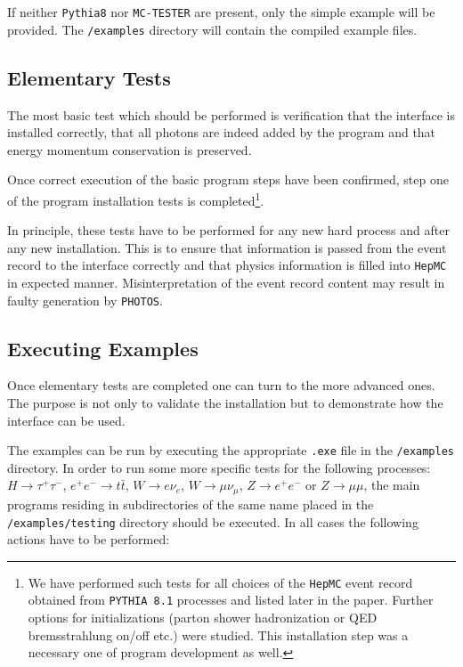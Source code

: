 \documentclass[]{Photos_interface_design}
\begin{document}
If neither {\tt Pythia8} nor {\tt MC-TESTER} are present, only the simple example will be provided. The {\tt /examples} directory will contain the compiled example files.

\subsection{Elementary Tests}
\label{sect:elem}
The most basic test which should be performed is verification that the interface is installed correctly, that all
photons are indeed added by the program and that energy momentum conservation is preserved.

Once correct execution of the basic program steps have been confirmed,
step one of the program installation tests  is completed\footnote{
We have  performed such  tests for all choices of the {\tt HepMC} event record obtained 
from  {\tt PYTHIA 8.1} processes and 
listed later in the paper. Further  options for initializations 
(parton shower hadronization or QED bremsstrahlung on/off etc.) were studied.
This installation step  was a necessary one of program development as well.}.

In principle, these tests have to be performed for any new hard 
process and after any new installation. This is to ensure that 
information is passed from the event record to the interface 
correctly and that physics information is filled into {\tt HepMC} 
in expected manner. Misinterpretation of the event record content may result in 
faulty generation by {\tt PHOTOS}.


\subsection{Executing Examples}

Once elementary tests are completed one can turn to the more advanced ones.
The purpose is not only to validate the installation but to demonstrate how the
interface can be used.

The examples can be run by executing the appropriate {\tt .exe} file in the {\tt /examples} directory.
In order to run some more specific tests for the following processes:
$H \rightarrow \tau^+ \tau^-$, $ e^+ e^- \rightarrow t \bar t$,
$W \rightarrow e \nu_e$, $W \rightarrow \mu \nu_\mu$,
$Z \rightarrow e^+ e^-$ or $Z \rightarrow \mu \mu$,
the main programs residing in subdirectories of the same name placed in the
{\tt /examples/testing} directory should be executed.
In all cases the following actions have to be performed:
\end{document}
